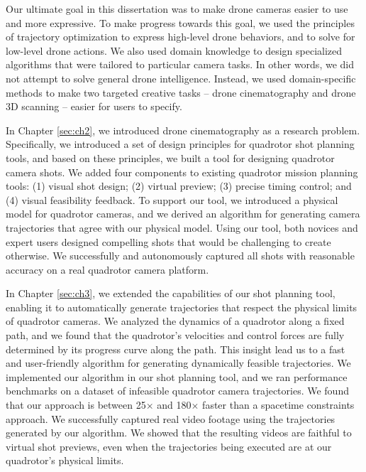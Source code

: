 \label{sec:ch5}

Our ultimate goal in this dissertation was to make drone cameras easier to use and more expressive.
To make progress towards this goal, we used the principles of trajectory optimization to express high-level drone behaviors, and to solve for low-level drone actions.
We also used domain knowledge to design specialized algorithms that were tailored to particular camera tasks.
In other words, we did not attempt to solve general drone intelligence.
Instead, we used domain-specific methods to make two targeted creative tasks -- drone cinematography and drone 3D scanning -- easier for users to specify.

In Chapter \ref{sec:ch2}, we introduced drone cinematography as a research problem.
Specifically, we introduced a set of design principles for quadrotor shot planning tools, and based on these principles, we built a tool for designing quadrotor camera shots.
We added four components to existing quadrotor mission planning tools: (1) visual shot design; (2) virtual preview; (3) precise timing control; and (4) visual feasibility feedback. 
To support our tool, we introduced a physical model for quadrotor cameras, and we derived an algorithm for generating camera trajectories that agree with our physical model.
Using our tool, both novices and expert users designed compelling shots that would be challenging to create otherwise.
We successfully and autonomously captured all shots with reasonable accuracy on a real quadrotor camera platform.

In Chapter \ref{sec:ch3}, we extended the capabilities of our shot planning tool, enabling it to automatically generate trajectories that respect the physical limits of quadrotor cameras.
We analyzed the dynamics of a quadrotor along a fixed path, and we found that the quadrotor's velocities and control forces are fully determined by its progress curve along the path.
This insight lead us to a fast and user-friendly algorithm for generating dynamically feasible trajectories.
We implemented our algorithm in our shot planning tool, and we ran performance benchmarks on a dataset of infeasible quadrotor camera trajectories.
We found that our approach is between 25$\times$ and 180$\times$ faster than a spacetime constraints approach.
We successfully captured real video footage using the trajectories generated by our algorithm.
We showed that the resulting videos are faithful to virtual shot previews, even when the trajectories being executed are at our quadrotor's physical limits.

